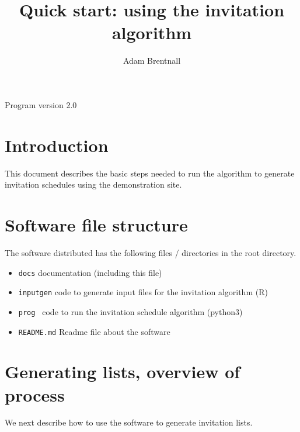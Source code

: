 \documentclass[a4paper]{article}
\title{Quick start: using the invitation algorithm}
\author{Adam Brentnall}
\begin{document}
\maketitle
Program version 2.0

\section{Introduction}

This document describes the basic steps needed to run the algorithm to generate invitation schedules using the demonstration site. 

\section{Software file structure}

The software distributed has the following files / directories in the root directory.
\begin{itemize}
	\item \texttt{docs} documentation (including this file)
	\item \texttt{inputgen} code to generate input files for the invitation algorithm (R)
	\item \texttt{prog } code to run the invitation schedule algorithm (python3)
	\item \texttt{README.md} Readme file about the software
\end{itemize}

\section{Generating lists, overview of process}

We next describe how to use the software to generate invitation lists.
\end{document}
